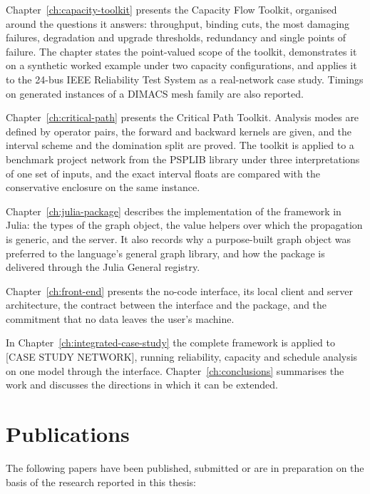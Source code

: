 \documentclass[12pt]{report}
\newcommand{\CaseStudyNetwork}{[CASE STUDY NETWORK]}
\begin{document}
Chapter~\ref{ch:capacity-toolkit} presents the Capacity Flow Toolkit, organised around the
questions it answers: throughput, binding cuts, the most damaging failures, degradation and
upgrade thresholds, redundancy and single points of failure. The chapter states the point-valued
scope of the toolkit, demonstrates it on a synthetic worked example under two capacity
configurations, and applies it to the 24-bus IEEE Reliability Test System as a real-network case
study. Timings on generated instances of a DIMACS mesh family are also reported.

Chapter~\ref{ch:critical-path} presents the Critical Path Toolkit. Analysis modes are defined
by operator pairs, the forward and backward kernels are given, and the interval scheme and the
domination split are proved. The toolkit is applied to a benchmark project network from the PSPLIB library under
three interpretations of one set of inputs, and the exact interval floats are compared with the
conservative enclosure on the same instance.

Chapter~\ref{ch:julia-package} describes the implementation of the framework in Julia: the
types of the graph object, the value helpers over which the propagation is generic, and the
server. It also records why a purpose-built graph object was preferred to the language's
general graph library, and how the package is delivered through the Julia General registry.

Chapter~\ref{ch:front-end} presents the no-code interface, its local client and server
architecture, the contract between the interface and the package, and the commitment that no
data leaves the user's machine.

In Chapter~\ref{ch:integrated-case-study} the complete framework is applied to
\CaseStudyNetwork, running reliability, capacity and schedule analysis on one model through
the interface. Chapter~\ref{ch:conclusions} summarises the work and discusses the directions
in which it can be extended.

\section{Publications}
\label{sec:intro-publications}

The following papers have been published, submitted or are in preparation on the basis of the
research reported in this thesis:
\end{document}
